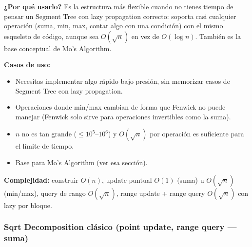\documentclass[10pt,a4paper,twocolumn]{article}
\begin{document}
\textbf{¿Por qué usarlo?} Es la estructura más flexible cuando no
tienes tiempo de pensar un Segment Tree con lazy propagation
correcto: soporta casi cualquier operación (suma, min, max, contar
algo con una condición) con el mismo esqueleto de código, aunque sea
$O(\sqrt n)$ en vez de $O(\log n)$. También es la base conceptual de
Mo's Algorithm.

\textbf{Casos de uso:}

\begin{itemize}
    \item Necesitas implementar algo rápido bajo presión, sin
    memorizar casos de Segment Tree con lazy propagation.
    \item Operaciones donde min/max cambian de forma que Fenwick no
    puede manejar (Fenwick solo sirve para operaciones invertibles
    como la suma).
    \item $n$ no es tan grande ($\le 10^5$–$10^6$) y $O(\sqrt n)$ por
    operación es suficiente para el límite de tiempo.
    \item Base para Mo's Algorithm (ver esa sección).
\end{itemize}

\textbf{Complejidad:} construir $O(n)$, update puntual $O(1)$ (suma)
u $O(\sqrt n)$ (min/max), query de rango $O(\sqrt n)$, range update +
range query $O(\sqrt n)$ con lazy por bloque.


\subsubsection{Sqrt Decomposition clásico (point update, range query — suma)}
\end{document}
